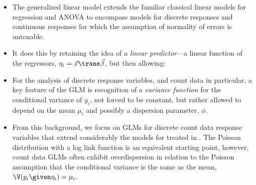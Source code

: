 \begin{itemize}

  \item The generalized linear model extends the familiar classical linear models for regression and ANOVA to encompass
  models for discrete responses and continuous responses for which the assumption of normality of errors is untenable.

  \item It does this by retaining the idea of a \emph{linear
      predictor}---a linear function of the regressors,
  $\eta_i = \vec{x}\trans \vec{\beta}$, but then allowing:

  \item For the analysis of discrete response variables, and count data in particular, a key feature
  of the GLM is recognition of a \emph{variance function} for the conditional variance of
  $y_i$, not forced to be constant, but rather allowed to depend on the mean $\mu_i$ and
  possibly a dispersion parameter, $\phi$.

  \item From this background, we focus on GLMs for discrete count data response variables that extend considerably
  the \loglin models for \ctabs
  treated in .  The Poisson distribution with a log
  link function is an equivalent starting point, however, count data
  GLMs often exhibit overdispersion in relation to the Poisson assumption that the conditional variance
  is the same as the mean, $\V(y_i \given \eta_i) = \mu_i$.


\end{itemize}
